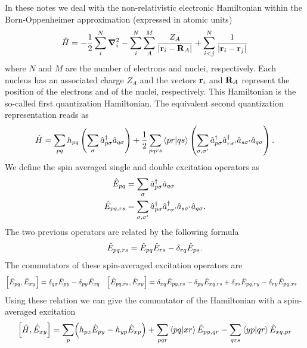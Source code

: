 \documentclass[11pt,a4paper]{article}
\newcommand{\hH}{\Hat{H}} %
\newcommand{\hE}{\Hat{E}} %
\begin{document}
In these notes we deal with the non-relativistic electronic Hamiltonian within the Born-Oppenheimer approximation (expressed in atomic units)
\begin{equation}
  \label{eq:hamiltonianFirstQuant}
  \hH = -\frac{1}{2}\sum_i^N \grad_i^2 - \sum_i^N\sum_A^M\frac{Z_A}{\abs{\vb{r}_i-\vb{R}_A}} + \sum_{i<j}^N\frac{1}{\abs{\vb{r}_i-\vb{r}_j}}
\end{equation}
where $N$ and $M$ are the number of electrons and nuclei, respectively. Each nucleus has an associated charge $Z_A$ and the vectors $\vb{r}_i$ and $\vb{R}_A$ represent the position of the electrons and of the nuclei, respectively. This Hamiltonian is the so-called first quantization Hamiltonian. The equivalent second quantization representation reads as
\begin{equation}
  \label{eq:hamiltonianSecondQuant}
  \hH = \sum_{pq} h_{pq} \left(\sum_\sigma \hat{a}_{p\sigma}^\dagger \hat{a}_{q\sigma}\right) + \frac{1}{2}\sum_{pqrs}\braket{pr}{qs}\left(\sum_{\sigma,\sigma'}\hat{a}_{p\sigma}^\dagger\hat{a}_{r\sigma'}^\dagger\hat{a}_{s\sigma'}\hat{a}_{q\sigma}\right).
\end{equation}
We define the spin averaged single and double excitation operators as
\begin{align}
  \label{eq:excOp}
  \hE_{pq} &=\sum_\sigma \hat{a}_{p\sigma}^\dagger \hat{a}_{q\sigma} \\
  \hE_{pq,rs} &=\sum_{\sigma,\sigma'}\hat{a}_{p\sigma}^\dagger\hat{a}_{r\sigma'}^\dagger\hat{a}_{s\sigma'}\hat{a}_{q\sigma}.
\end{align}
The two previous operators are related by the following formula
\begin{equation}
  \label{eq:excOpRelation}
  \hE_{pq,rs} = \hE_{pq}\hE_{rs}-\delta_{rq}\hE_{ps}.
\end{equation}
The commutators of these spin-averaged excitation operators are
\begin{align}
  \label{eq:commExcOp}
  \comm{\hE_{pq}}{\hE_{xy}}&=\delta_{qx}\hE_{py} - \delta_{py}\hE_{xq} & \comm{\hE_{pq,rs}}{\hE_{xy}}&=\delta_{xq}\hE_{py,rs} - \delta_{py}\hE_{xq,rs} + \delta_{xs}\hE_{pq,ry} - \delta_{ry}\hE_{pq,xs}
\end{align}
Using these relation we can give the commutator of the Hamiltonian with a spin-averaged excitation
\begin{equation}
  \label{eq:commHamExcOp}
  \comm{\hH}{\hE_{xy}} = \sum_p \mleft(h_{px}\hE_{py}-h_{yp}\hE_{xp}\mright) + \sum_{pqr}\braket{pq}{xr}\hE_{py,qr} - \sum_{qrs}\braket{yp}{qr}\hE_{xq,pr}
\end{equation}
\end{document}
